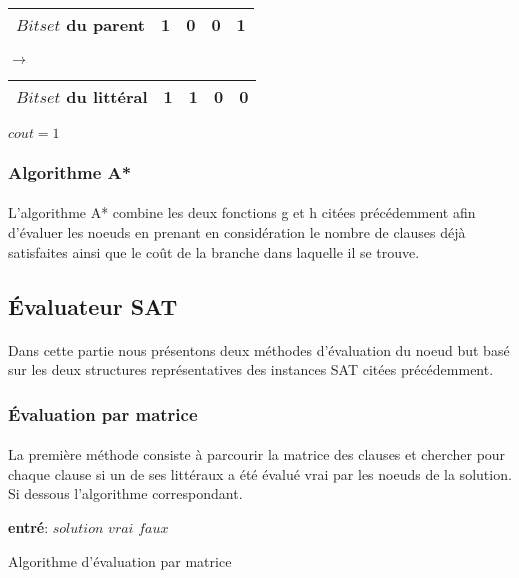 \begin{minipage}{0.5\textwidth}
	\centering
	\begin{tabular}{|c | c| c| c|c|}
		\hline
		$Bitset$ du parent& {\color{red}1} & 0 & 0 & 1 \\\hline
	\end{tabular}
\end{minipage}
$\rightarrow$
\begin{minipage}{0.5\textwidth}
	\centering
	\begin{tabular}{|c | c| c| c|c|}
		\hline
		$Bitset$ du littéral& {\color{red}1} & 1 & 0 & 0\\\hline
	\end{tabular}
\end{minipage}
\begin{center}
	$cout = 1$
\end{center}

\subsubsection{Algorithme A*}
\paragraph{}
L’algorithme A* combine les deux fonctions g et h citées précédemment afin d’évaluer les noeuds en prenant en considération le nombre de clauses déjà satisfaites ainsi que le coût de la branche dans laquelle il se trouve.
\subsection{Évaluateur SAT}
\paragraph{}
Dans cette partie nous présentons deux méthodes d’évaluation du noeud but basé sur les deux structures représentatives des instances SAT citées précédemment.
\subsubsection{Évaluation par matrice}
\paragraph{}
La première méthode consiste à parcourir la matrice des clauses et chercher pour chaque clause si un de ses littéraux a été évalué vrai par les noeuds de la solution. Si dessous l’algorithme correspondant.\\
\begin{algorithm}
	\SetAlgoLined
	\textbf{entré}: $solution$\;
	{
		\Return $vrai$\;
	}
	\Return $faux$\;
	\caption{Algorithme d'évaluation par matrice}
\end{algorithm}
